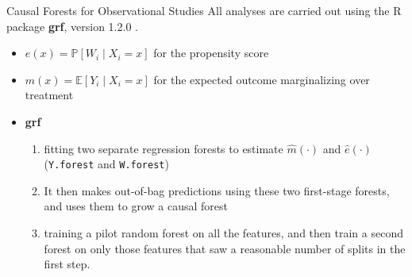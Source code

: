 \documentclass[mathserif, xcolor=table]{beamer}
\begin{document}
\begin{frame}{Causal Forests for Observational Studies}
All analyses are carried out using the R package \textbf{grf}, version 1.2.0 \citep{tibshirani2018package}.
\begin{itemize}
    \item $e(x) = \mathbb{P}[W_i\mid X_i = x]$ for the propensity score 
    \item $m(x) = \mathbb{E}[Y_i\mid X_i = x]$ for the expected outcome marginalizing over treatment
    \item \textbf{grf} 
    \begin{enumerate}
        \item fitting two separate regression forests to estimate $\hat{m}(\cdot)$ and $\hat{e}(\cdot)$ (\texttt{Y.forest} and \texttt{W.forest})
        \item It then makes out-of-bag predictions using these two first-stage forests, and uses them to grow a causal forest
        \item training a pilot random forest on all the features, and then train a second forest on only those features that saw a reasonable number of splits in the first step.
    \end{enumerate}
    \end{itemize}
\end{frame}
\end{document}
